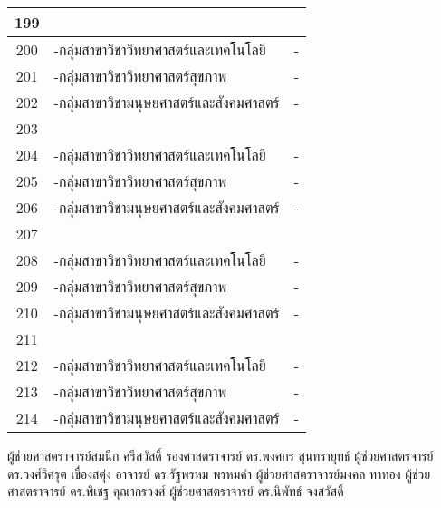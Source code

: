 \begin{longtable}{|c|p{}|c|}
	199&\cellcolor{red!10}{งานสร้างสรรค์ที่ได้รับการเผยแพร่ในระดับชาติ}&\cellcolor{red!10}{\textbf{-}}\\\hline
	200&-กลุ่มสาขาวิชาวิทยาศาสตร์และเทคโนโลยี&-\\\hline
	201&-กลุ่มสาขาวิชาวิทยาศาสตร์สุขภาพ&-\\\hline
	202&-กลุ่มสาขาวิชามนุษยศาสตร์และสังคมศาสตร์&-\\\hline
	
	203&\cellcolor{red!10}{งานสร้างสรรค์ที่ได้รับการเผยแพร่ในระดับความร่วมมือระหว่างประเทศ}&\cellcolor{red!10}{\textbf{-}}\\\hline
	204&-กลุ่มสาขาวิชาวิทยาศาสตร์และเทคโนโลยี&-\\\hline
	205&-กลุ่มสาขาวิชาวิทยาศาสตร์สุขภาพ&-\\\hline
	206&-กลุ่มสาขาวิชามนุษยศาสตร์และสังคมศาสตร์&-\\\hline
	
	207&\cellcolor{red!10}{งานสร้างสรรค์ที่ได้รับการเผยแพร่ในระดับภูมิภาคอาเซียน}&\cellcolor{red!10}{\textbf{-}}\\\hline
	208&-กลุ่มสาขาวิชาวิทยาศาสตร์และเทคโนโลยี&-\\\hline
	209&-กลุ่มสาขาวิชาวิทยาศาสตร์สุขภาพ&-\\\hline
	210&-กลุ่มสาขาวิชามนุษยศาสตร์และสังคมศาสตร์&-\\\hline
	
	211&\cellcolor{red!10}{งานสร้างสรรค์ที่ได้รับการเผยแพร่ในระดับนานาชาติ}&\cellcolor{red!10}{\textbf{-}}\\\hline
	212&-กลุ่มสาขาวิชาวิทยาศาสตร์และเทคโนโลยี&-\\\hline
	213&-กลุ่มสาขาวิชาวิทยาศาสตร์สุขภาพ&-\\\hline
	214&-กลุ่มสาขาวิชามนุษยศาสตร์และสังคมศาสตร์&-\\\hline
\end{longtable}

\clearpage
\authorization
{ผู้ช่วยศาสตราจารย์สมนึก ศรีสวัสดิ์}
{รองศาสตราจารย์ ดร.พงศกร สุนทรายุทธ์}
{ผู้ช่วยศาสตรจารย์ ดร.วงศ์วิศรุต เขื่องสตุ่ง}
{อาจารย์ ดร.รัฐพรหม พรหมคำ}
{ผู้ช่วยศาสตราจารย์มงคล ทาทอง}
{ผู้ช่วยศาสตราจารย์ ดร.พิเชฐ คุณากรวงศ์}
{ผู้ช่วยศาสตราจารย์ ดร.นิพัทธ์ จงสวัสดิ์}
























